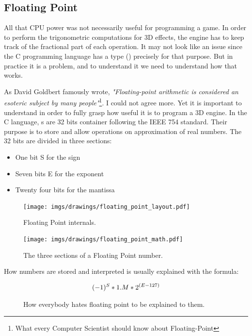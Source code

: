 \documentclass[book.tex]{subfiles}
\begin{document}
  \subsection{Floating Point}
  
   All that CPU power was not necessarily useful for programming a game. In order to perform the trigonometric computations for 3D effects, the engine has to keep track of the fractional part of each operation. It may not look like an issue since the C programming language has a type () precisely for that purpose. But in practice it is a problem, and to understand it we need to understand how that  works.\\
\par
 As David Goldbert famously wrote, \emph{"Floating-point arithmetic is considered an esoteric subject by many people"}\footnote{What every Computer Scientist should know about Floating-Point}. I could not agree more. Yet it is important to understand in order to fully grasp how useful it is to program a 3D engine. In the C language, s are 32 bits container following the IEEE 754 standard. Their purpose is to store and allow operations on approximation of real numbers. The 32 bits are divided in three sections:\\
\begin{itemize}
  \item One bit S for the sign
  \item Seven bits E for the exponent
  \item Twenty four bits for the mantissa
\end{itemize} 

\begin{figure}[H]
\centering
\texttt{[image: imgs/drawings/floating\_point\_layout.pdf]}
\caption{Floating Point internals.}
\end{figure}
  \bigskip



\begin{figure}[H]
\centering
\texttt{[image: imgs/drawings/floating\_point\_math.pdf]}
\caption{The three sections of a Floating Point number.}
\end{figure}
  \bigskip  


How numbers are stored and interpreted is usually explained with the formula:\\
\par
\begin{figure}[H]
\begin{equation}\label{eq:fp}
\large
(-1)^S * 1.M * 2^{(E-127)}
\end{equation}
 \caption{How everybody hates floating point to be explained to them.}
\end{figure}
\bigskip  
\end{document}

